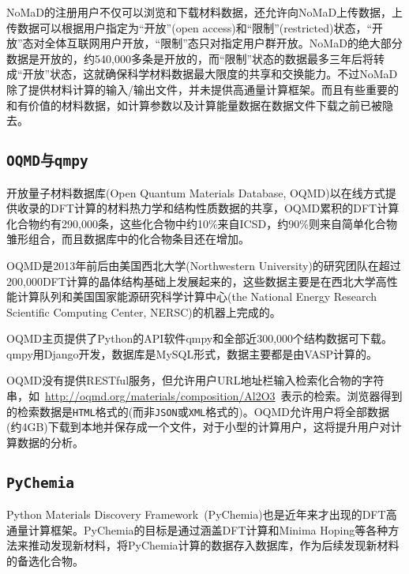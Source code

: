 \textrm{NoMaD}的注册用户不仅可以浏览和下载材料数据，还允许向\textrm{NoMaD}上传数据，上传数据可以根据用户指定为“开放”\textrm{(open access)}和“限制”\textrm{(restricted)}状态，“开放”态对全体互联网用户开放，“限制”态只对指定用户群开放。\textrm{NoMaD}的绝大部分数据是开放的，约540,000多条是开放的，而“限制”状态的数据最多三年后将转成“开放”状态，这就确保科学材料数据最大限度的共享和交换能力。不过\textrm{NoMaD}除了提供材料计算的输入/输出文件，并未提供高通量计算框架。而且有些重要的和有价值的材料数据，如计算参数以及计算能量数据在数据文件下载之前已被隐去。

\subsection{\tt{OQMD}与\tt{qmpy}}
开放量子材料数据库\textrm{(Open Quantum Materials Database, OQMD)}以在线方式提供收录的\textrm{DFT}计算的材料热力学和结构性质数据的共享\cite{OQMD_URL,NCM1-15010_2015}，\textrm{OQMD}累积的\textrm{DFT}计算化合物约有290,000条，这些化合物中约10\%来自\textrm{ICSD}，约90\%则来自简单化合物雏形组合，而且数据库中的化合物条目还在增加。

\textrm{OQMD}是2013年前后由美国西北大学\textrm{(Northwestern University)}的研究团队在超过200,000\textrm{DFT}计算的晶体结构基础上发展起来的，这些数据主要是在西北大学高性能计算队列和美国国家能源研究科学计算中心\textrm{(the National Energy Research Scientific Computing Center, NERSC)}的机器上完成的。

\textrm{OQMD}主页提供了\textrm{Python}的\textrm{API}软件\textrm{qmpy}\cite{qmpy_URL}和全部近300,000个结构数据可下载。\textrm{qmpy}用\textrm{Django}开发，数据库是\textrm{MySQL}形式，数据主要都是由\textrm{VASP}计算的。

\textrm{OQMD}没有提供\textrm{RESTful}服务，但允许用户\textrm{URL}地址栏输入检索化合物的字符串，如~\textrm{\url{http://oqmd.org/materials/composition/Al2O3}}~表示的检索。浏览器得到的检索数据是\texttt{HTML}格式的(而非\texttt{JSON}或\texttt{XML}格式的)。\textrm{OQMD}允许用户将全部数据(约4\textrm{GB})下载到本地并保存成一个文件，对于小型的计算用户，这将提升用户对计算数据的分析。

\subsection{\tt{PyChemia}}
\textrm{Python Materials Discovery Framework~(PyChemia)}也是近年来才出现的\textrm{DFT}高通量计算框架。\textrm{PyChemia}的目标是通过涵盖\textrm{DFT}计算和\textrm{Minima Hoping}等各种方法来推动发现新材料，将\textrm{PyChemia}计算的数据存入数据库，作为后续发现新材料的备选化合物。

